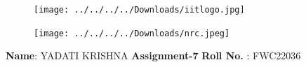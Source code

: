 \documentclass[10pt,a4paper]{report}
\begin{document}
\begin{figure}[!tbp]
  \centering
  \begin{minipage}[b]{0.4\textwidth}
\texttt{[image: ../../../../Downloads/iitlogo.jpg]} 
  \end{minipage}
  \hfill
  \vspace{5mm}\begin{minipage}[b]{0.4\textwidth}
\raggedleft  \texttt{[image: ../../../../Downloads/nrc.jpeg]}  

  \end{minipage}\vspace{0.2cm}
\end{figure}
\raggedright \textbf{Name}:\hspace{1mm} YADATI KRISHNA\hspace{3cm} \Large \textbf{Assignment-7}\hspace{2.5cm} %
\normalsize \textbf{Roll No.} :\hspace{1mm} FWC22036\vspace{1cm}
\end{document}
